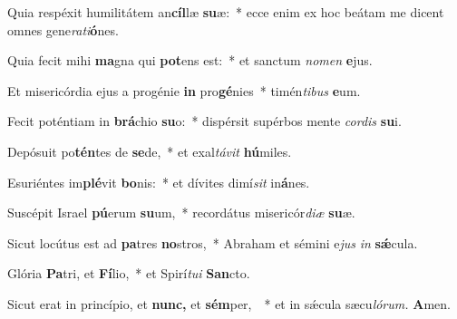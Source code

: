 \item Quia respéxit humilitátem an\textbf{cíl}læ \textbf{su}æ:~* ecce enim ex hoc beátam me dicent omnes gene\textit{rati}\textbf{ó}nes.
\item Quia fecit mihi \textbf{ma}gna qui \textbf{pot}ens est:~* et sanctum \textit{nomen} \textbf{e}jus.
\item Et misericórdia ejus a progénie \textbf{in} pro\textbf{gé}nies~* timén\textit{tibus} \textbf{e}um.
\item Fecit poténtiam in \textbf{brá}chio \textbf{su}o:~* dispérsit supérbos mente \textit{cordis} \textbf{su}i.
\item Depósuit po\textbf{tén}tes de \textbf{se}de,~* et exal\textit{távit} \textbf{hú}miles.
\item Esuriéntes im\textbf{plé}vit \textbf{bo}nis:~* et dívites dimí\hspace{0.02em}\textit{sit} in\textbf{á}nes.
\item Suscépit Israel \textbf{pú}erum \textbf{su}um,~* recordátus misericór\textit{diæ} \textbf{su}æ.
\item Sicut locútus est ad \textbf{pa}tres \textbf{no}stros,~* Abraham et sémini e\hspace{0.02em}\textit{jus} \textit{in} \textbf{sǽ}cula.
\item Glória \textbf{Pa}tri, et \textbf{Fí}lio,~* et Spirí\tinyhspace\textit{tui} \textbf{San}cto.
\item Sicut erat in princípio, et \textbf{nunc,} et \textbf{sém}per, ~* et in sǽcula sæcu\tinyhspace\textit{lórum.} \textbf{A}men.